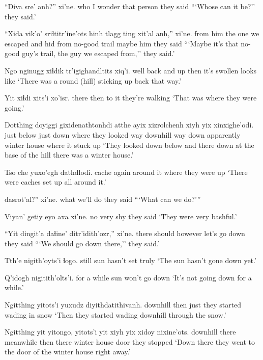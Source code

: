 \documentclass[12pt]{article}
\begin{document}
\gll ``Diva sre' anh?'' xi'ne.
who {I wonder} {that person} {they said}
\glt ```Whose can it be?'' they said.'
\glend

\gll ``Xida vik'o' {sriɬtitr'ine'ots hinh} tlagg ting xit'al anh,'' xi'ne.
{} {from him} {the one we escaped and hid from} no-good trail maybe him {they said}
\glt ```Maybe it's that no-good guy's trail, the guy we escaped from,'' they said.'
\glend

\gll Ngo nginugg xiɬdik tr'igighandltits xiq'i.
well {back and up} then {it's swollen} {looks like}
\glt `There was a round (hill) sticking up back that way.'
\glend

\gll Yit xiɬdi xits'i xo'isr.
there then {to it} {they're walking}
\glt `That was where they were going.'
\glend

\gll Dotthing doyiggi gixidenathtonhdi atthe ayix xizrolchenh xiyh yix xinxighe'odi.
{just below} {just down} {where they looked} {way downhill} {way down} apparently winter house {where it stuck up}
\glt `They looked down below and there down at the base of the hill there was a winter house.'
\glend

\gll Tso che yuxo'egh dathdlodi.
cache again {around it} {where they were up}
\glt `There were caches set up all around it.'
\glend

 dasrot'al?'' xi'ne.
what {we'll do} {they said}
\glt ```What can we do?'''
\glend

\gll Viyan' getiy {eyo axa} xi'ne.
no very shy {they said}
\glt `They were very bashful.'
\glend

\gll ``Yit dingit'a daɬine' ditr'idith'ozr,'' xi'ne.
there should however {let's go down} {they said}
\glt ```We should go down there,'' they said.'
\glend

\gll Tth'e nigith'oyts'i ɬogo.
still {sun hasn't set} truly
\glt `The sun hasn't gone down yet.'
\glend

\gll Q'idogh nigitith'olts'i.
{for a while} {sun won't go down}
\glt `It's not going down for a while.'
\glend

\gll Ngitthing yitots'i yuxudz diyithdatithivanh.
downhill then just {they started wading in snow}
\glt `Then they started wading downhill through the snow.'
\glend

\gll Ngitthing yit yitongo, yitots'i yit xiyh yix xidoy nixine'ots.
downhill there meanwhile then there winter house door {they stopped}
\glt `Down there they went to the door of the winter house right away.'
\glend
\end{document}
